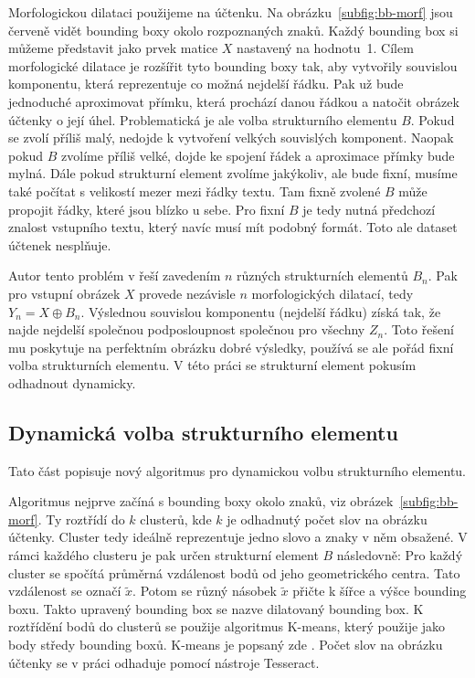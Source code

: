 \documentclass[thesis=B,czech]{FITthesis}[2019/12/23]
\begin{document}
\newpage
Morfologickou dilataci použijeme na účtenku. Na obrázku~\ref{subfig:bb-morf} jsou červeně vidět bounding boxy okolo rozpoznaných znaků. Každý bounding box si můžeme představit jako prvek matice $X$ nastavený na hodnotu~1. Cílem morfologické dilatace je rozšířit tyto bounding boxy tak, aby vytvořily souvislou komponentu, která reprezentuje co možná nejdelší řádku. Pak už bude jednoduché aproximovat přímku, která prochází danou řádkou a natočit obrázek účtenky o její úhel. Problematická je ale volba strukturního elementu $B$. Pokud se zvolí příliš malý, nedojde k vytvoření velkých souvislých komponent. Naopak pokud $B$ zvolíme příliš velké, dojde ke spojení řádek a aproximace přímky bude mylná. Dále pokud strukturní element zvolíme jakýkoliv, ale bude fixní, musíme také počítat s velikostí mezer mezi řádky textu. Tam fixně zvolené $B$ může propojit řádky, které jsou blízko u sebe. Pro fixní $B$ je tedy nutná předchozí znalost vstupního textu, který navíc musí mít podobný formát. Toto ale dataset účtenek nesplňuje.

Autor tento problém v  \cite{Brodic2012} řeší zavedením $n$ různých strukturních elementů $B_n$. Pak pro vstupní obrázek $X$ provede nezávisle $n$ morfologických dilatací, tedy $Y_n = X \oplus B_n$. Výslednou souvislou komponentu (nejdelší řádku) získá tak, že najde nejdelší společnou podposloupnost společnou pro všechny $Z_n$. Toto řešení mu poskytuje na perfektním obrázku dobré výsledky, používá se ale pořád fixní volba strukturních elementu. V této práci se strukturní element pokusím odhadnout dynamicky.

\newpage
\subsection{Dynamická volba strukturního elementu}
Tato část popisuje nový algoritmus pro dynamickou volbu strukturního elementu.

Algoritmus nejprve začíná s bounding boxy okolo znaků, viz obrázek~\ref{subfig:bb-morf}. Ty roztřídí do $k$ clusterů, kde $k$ je odhadnutý počet slov na obrázku účtenky. Cluster tedy ideálně reprezentuje jedno slovo a znaky v něm obsažené. V rámci každého clusteru je pak určen strukturní element $B$ následovně: Pro každý cluster se spočítá průměrná vzdálenost bodů od jeho geometrického centra. Tato vzdálenost se označí $\tilde{x}$. Potom se různý násobek $\tilde{x}$ přičte k šířce a výšce bounding boxu. Takto upravený bounding box se nazve dilatovaný bounding box. K roztřídění bodů do clusterů se použije algoritmus K-means, který použije jako body středy bounding boxů. K-means je popsaný zde  \cite{kloudaAlgoritmusKmeans2019}. Počet slov na obrázku účtenky se v práci odhaduje pomocí nástroje Tesseract.
\end{document}
